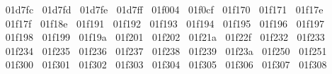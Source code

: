 {  ^^^^^^01d7fc%
  ^^^^^^01d7fd%
  ^^^^^^01d7fe%
  ^^^^^^01d7ff%
  ^^^^^^01f004%
  ^^^^^^01f0cf%
  ^^^^^^01f170%
  ^^^^^^01f171%
  ^^^^^^01f17e%
  ^^^^^^01f17f%
  ^^^^^^01f18e%
  ^^^^^^01f191%
  ^^^^^^01f192%
  ^^^^^^01f193%
  ^^^^^^01f194%
  ^^^^^^01f195%
  ^^^^^^01f196%
  ^^^^^^01f197%
  ^^^^^^01f198%
  ^^^^^^01f199%
  ^^^^^^01f19a%
  ^^^^^^01f201%
  ^^^^^^01f202%
  ^^^^^^01f21a%
  ^^^^^^01f22f%
  ^^^^^^01f232%
  ^^^^^^01f233%
  ^^^^^^01f234%
  ^^^^^^01f235%
  ^^^^^^01f236%
  ^^^^^^01f237%
  ^^^^^^01f238%
  ^^^^^^01f239%
  ^^^^^^01f23a%
  ^^^^^^01f250%
  ^^^^^^01f251%
  ^^^^^^01f300%
  ^^^^^^01f301%
  ^^^^^^01f302%
  ^^^^^^01f303%
  ^^^^^^01f304%
  ^^^^^^01f305%
  ^^^^^^01f306%
  ^^^^^^01f307%
  ^^^^^^01f308%
}
